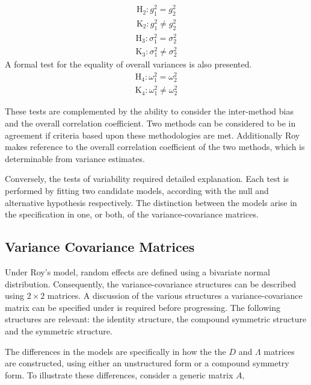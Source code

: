 \documentclass[12pt, a4paper]{report}
\theoremstyle{plain}
\theoremstyle{definition}
\theoremstyle{remark}
\begin{document}
	\begin{eqnarray*}
		\operatorname{H_2} : g^2_1 = g^2_2 \\
		\operatorname{K_2} : g^2_1 \neq g^2_2
	\end{eqnarray*}%
	\begin{eqnarray*}
		\operatorname{H_3} : \sigma^2_1 = \sigma^2_2 \\
		\operatorname{K_3} : \sigma^2_1 \neq \sigma^2_2
	\end{eqnarray*}
	A formal test for the equality of overall variances is also presented.
	\begin{eqnarray*}
		\operatorname{H_4} : \omega^2_1 = \omega^2_2 \\
		\operatorname{K_4} : \omega^2_1 \neq \omega^2_2
	\end{eqnarray*}
	
	
	These tests are complemented by the ability to consider the inter-method bias and the overall correlation coefficient.
	Two methods can be considered to be in agreement if criteria based upon these methodologies are met. Additionally Roy makes reference to the overall correlation coefficient of the two methods, which is determinable from variance estimates.
	
	Conversely, the tests of variability required detailed explanation. Each test is performed by fitting two candidate models, according with the null and alternative hypothesis respectively. The distinction between the models arise in the specification in one, or both, of the variance-covariance matrices. %
	
	
	\subsection{Variance Covariance Matrices }
	
	Under Roy's model, random effects are defined using a bivariate normal distribution. Consequently, the variance-covariance structures can be described using $2 \times 2$  matrices. A discussion of the various structures a variance-covariance matrix can be specified under is required before progressing. The following structures are relevant: the identity structure, the compound symmetric structure and the symmetric structure.
	
	The differences in the models are specifically in how the the $D$ and $\Lambda$ matrices are constructed, using either an unstructured form or a compound symmetry form. To illustrate these differences, consider a generic matrix $A$,
	
\end{document}
